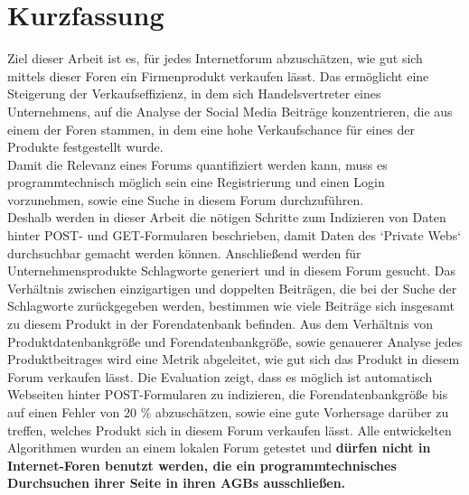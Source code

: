 \documentclass[%
a4paper,
DIV12, 
2.5headlines, 
bigheadings, 
titlepage, 
openbib,
]{scrartcl}
\newcommand{\mainmatter}{\pagenumbering{arabic}\setcounter{page}{1}}
\begin{document}
\section*{Kurzfassung}{
Ziel dieser Arbeit ist es, für jedes Internetforum abzuschätzen, wie gut sich mittels dieser Foren ein Firmenprodukt verkaufen lässt. Das ermöglicht eine Steigerung der Verkaufseffizienz, in dem sich Handelsvertreter eines Unternehmens, auf die Analyse der Social Media Beiträge konzentrieren, die aus einem der Foren stammen, in dem eine hohe Verkaufschance für eines der Produkte festgestellt wurde.\\
Damit die Relevanz eines Forums quantifiziert werden kann, muss es programmtechnisch möglich sein eine Registrierung und einen Login vorzunehmen, sowie eine Suche in diesem Forum durchzuführen. \\ Deshalb werden in dieser Arbeit die nötigen Schritte zum Indizieren von Daten hinter POST- und GET-Formularen beschrieben, damit Daten des `Private Webs` durchsuchbar gemacht werden können. Anschließend werden für Unternehmensprodukte Schlagworte generiert und in diesem Forum gesucht. Das Verhältnis zwischen einzigartigen und doppelten Beiträgen, die bei der Suche der Schlagworte zurückgegeben werden, bestimmen wie viele Beiträge sich insgesamt zu diesem Produkt in der Forendatenbank befinden. Aus dem Verhältnis von Produktdatenbankgröße und Forendatenbankgröße, sowie genauerer Analyse jedes Produktbeitrages wird eine Metrik abgeleitet, wie gut sich das Produkt in diesem Forum verkaufen lässt. Die Evaluation zeigt, dass es möglich ist automatisch Webseiten hinter POST-Formularen zu indizieren, die Forendatenbankgröße bis auf einen Fehler von 20 \% abzuschätzen, sowie eine gute Vorhersage darüber zu treffen, welches Produkt sich in diesem Forum verkaufen lässt. Alle entwickelten Algorithmen wurden an einem lokalen Forum getestet und \textbf{dürfen nicht in Internet-Foren benutzt werden, die ein programmtechnisches Durchsuchen ihrer Seite in ihren AGBs ausschließen.}}


\newpage
	
	\tableofcontents
	\clearpage
	\mainmatter

	
	
	
	
		
	
	\clearpage
	\nocite{*}
    	
   	
   	
	
\end{document}
